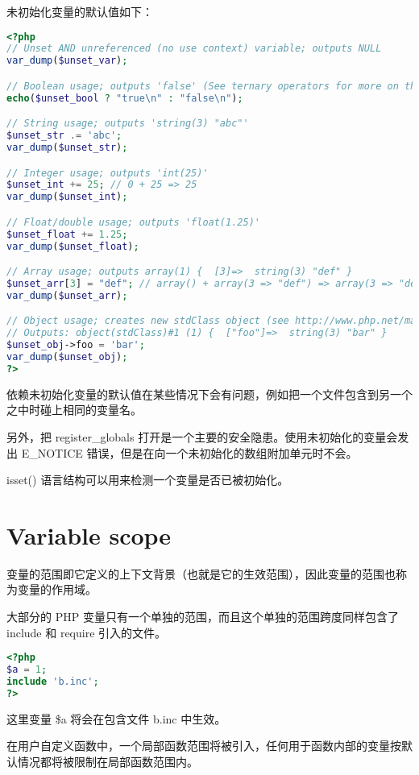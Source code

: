 未初始化变量的默认值如下：


\begin{lstlisting}[language=PHP]
<?php
// Unset AND unreferenced (no use context) variable; outputs NULL
var_dump($unset_var);

// Boolean usage; outputs 'false' (See ternary operators for more on this syntax)
echo($unset_bool ? "true\n" : "false\n");

// String usage; outputs 'string(3) "abc"'
$unset_str .= 'abc';
var_dump($unset_str);

// Integer usage; outputs 'int(25)'
$unset_int += 25; // 0 + 25 => 25
var_dump($unset_int);

// Float/double usage; outputs 'float(1.25)'
$unset_float += 1.25;
var_dump($unset_float);

// Array usage; outputs array(1) {  [3]=>  string(3) "def" }
$unset_arr[3] = "def"; // array() + array(3 => "def") => array(3 => "def")
var_dump($unset_arr);

// Object usage; creates new stdClass object (see http://www.php.net/manual/en/reserved.classes.php)
// Outputs: object(stdClass)#1 (1) {  ["foo"]=>  string(3) "bar" }
$unset_obj->foo = 'bar';
var_dump($unset_obj);
?>
\end{lstlisting}

依赖未初始化变量的默认值在某些情况下会有问题，例如把一个文件包含到另一个之中时碰上相同的变量名。

另外，把 register\_globals 打开是一个主要的安全隐患。使用未初始化的变量会发出 E\_NOTICE 错误，但是在向一个未初始化的数组附加单元时不会。

isset() 语言结构可以用来检测一个变量是否已被初始化。


\section{Variable scope}


变量的范围即它定义的上下文背景（也就是它的生效范围），因此变量的范围也称为变量的作用域。

大部分的 PHP 变量只有一个单独的范围，而且这个单独的范围跨度同样包含了 include 和 require 引入的文件。


\begin{lstlisting}[language=PHP]
<?php
$a = 1;
include 'b.inc';
?>
\end{lstlisting}

这里变量 \$a 将会在包含文件 b.inc 中生效。

在用户自定义函数中，一个局部函数范围将被引入，任何用于函数内部的变量按默认情况都将被限制在局部函数范围内。

